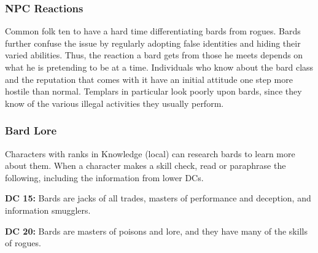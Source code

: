 \subsubsection{NPC Reactions}

Common folk ten to have a hard time differentiating bards from rogues. Bards further confuse the issue by regularly adopting false identities and hiding their varied abilities. Thus, the reaction a bard gets from those he meets depends on what he is pretending to be at a time. Individuals who know about the bard class and the reputation that comes with it have an initial attitude one step more hostile than normal. Templars in particular look poorly upon bards, since they know of the various illegal activities they usually perform.

\subsubsection{Bard Lore}

Characters with ranks in Knowledge (local) can research bards to learn more about them. When a character makes a skill check, read or paraphrase the following, including the information from lower DCs.

\textbf{DC 15:} Bards are jacks of all trades, masters of performance and deception, and information smugglers.

\textbf{DC 20:} Bards are masters of poisons and lore, and they have many of the skills of rogues.
